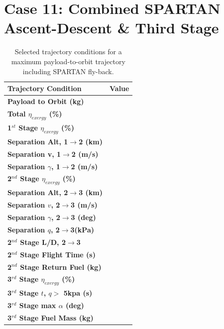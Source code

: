 \section{Case 11: Combined SPARTAN Ascent-Descent \& Third Stage}
\begin{table}[ht]
	\centering
\begin{tabular}{l c } 
	\hline \textbf{Trajectory Condition}
	& Value

	\\
	\hline \textbf{Payload to Orbit (kg)}
	& \textbf{\PayloadToOrbitStandard}
	\\
	\textbf{Total $\eta_{exergy}$ (\%)}
	& \textbf{\totalExergyEffStandard}
	\\
	\hline 
	\textbf{1$^{st}$ Stage $\eta_{exergy}$ (\%)}
	& \textbf{\firstExergyEffStandard}
	\\
	\textbf{Separation Alt, 1$\rightarrow$2 (km)}
	& \firstsecondSeparationAltStandard
	\\
	\textbf{Separation v, 1$\rightarrow$2 (m/s)}
	& \firstsecondSeparationvStandard
	\\
	\textbf{Separation $\gamma$, 1$\rightarrow$2 (m/s)}
	& \firstsecondSeparationgammaStandard
	\\
	\hline 
	\textbf{2$^{nd}$ Stage $\eta_{exergy}$ (\%)}
	& \textbf{\secondExergyEffStandard}
	\\
	\textbf{Separation Alt, 2$\rightarrow$3 (km)}
	& \secondthirdSeparationAltStandard
	\\
	\textbf{Separation $v$, 2$\rightarrow$3 (m/s)}
	& \secondthirdSeparationvStandard
	\\
	\textbf{Separation $\gamma$, 2$\rightarrow$3 (deg)}
	& \secondthirdSeparationgammaStandard
	\\
	\textbf{Separation $q$, 2$\rightarrow$3(kPa)}
	& \secondthirdSeparationqStandard
	\\
	\textbf{2$^{nd}$ Stage L/D, 2$\rightarrow$3}
	& \secondthirdSeparationLDStandard
	\\
	\textbf{2$^{nd}$ Stage Flight Time (s)}
	& \secondFlightTimeStandard
	\\
		\textbf{2$^{nd}$ Stage Return Fuel (kg)}
		& \returnFuelStandard
		\\
	\hline 
	\textbf{3$^{rd}$ Stage $\eta_{exergy}$ (\%)}
	& \textbf{\thirddExergyEffStandard}
	\\

	\textbf{3$^{rd}$ Stage $t$, $q >$ 5kpa (s)}
	& \thirdqOverFiveStandard
	\\
	\textbf{3$^{rd}$ Stage max $\alpha$ (deg)}
	& \thirdmaxAoAStandard
	\\
	\textbf{3$^{rd}$ Stage Fuel Mass (kg)}
	& \thirdmFuelStandard
	\\
	\hline 
\end{tabular} 
\caption{Selected trajectory conditions for a maximum payload-to-orbit trajectory including SPARTAN fly-back.}
\end{table}

